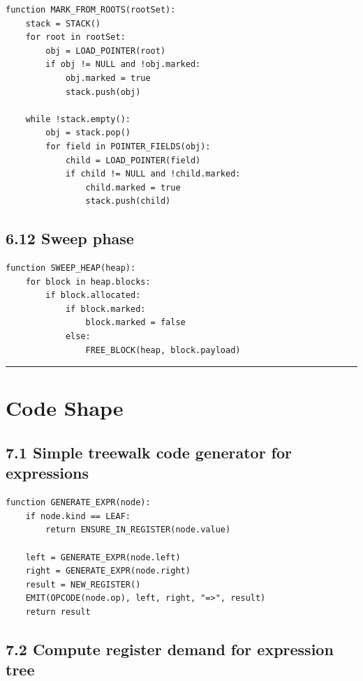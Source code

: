\documentclass[10pt,letterpaper]{article}
\begin{document}
\begin{verbatim}
function MARK_FROM_ROOTS(rootSet):
    stack = STACK()
    for root in rootSet:
        obj = LOAD_POINTER(root)
        if obj != NULL and !obj.marked:
            obj.marked = true
            stack.push(obj)

    while !stack.empty():
        obj = stack.pop()
        for field in POINTER_FIELDS(obj):
            child = LOAD_POINTER(field)
            if child != NULL and !child.marked:
                child.marked = true
                stack.push(child)
\end{verbatim}

\subsection*{6.12 Sweep phase}
{}

\begin{verbatim}
function SWEEP_HEAP(heap):
    for block in heap.blocks:
        if block.allocated:
            if block.marked:
                block.marked = false
            else:
                FREE_BLOCK(heap, block.payload)
\end{verbatim}

\medskip\hrule\medskip

\clearpage
\section{Code Shape}

\subsection*{7.1 Simple treewalk code generator for expressions}
{}

\begin{verbatim}
function GENERATE_EXPR(node):
    if node.kind == LEAF:
        return ENSURE_IN_REGISTER(node.value)

    left = GENERATE_EXPR(node.left)
    right = GENERATE_EXPR(node.right)
    result = NEW_REGISTER()
    EMIT(OPCODE(node.op), left, right, "=>", result)
    return result
\end{verbatim}

\subsection*{7.2 Compute register demand for expression tree}
{}
\end{document}
